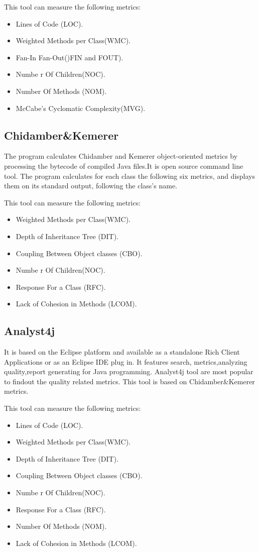 This tool can measure the following metrics:
\begin{itemize}
	\item Lines of Code (LOC). 
	\item Weighted Methods per Class(WMC).
	\item Fan-In Fan-Out()FIN and FOUT).
	\item Numbe r Of Children(NOC).
	\item Number Of Methods (NOM).
	\item McCabe's Cyclomatic Complexity(MVG).
\end{itemize}

\subsection{Chidamber\&Kemerer}

The program calculates Chidamber and Kemerer object-oriented metrics by processing the bytecode of compiled Java files.It is open source command line tool. The program calculates for each class the following six metrics, and displays them on its standard output, following the class's name.

This tool can measure the following metrics:

\begin{itemize}
	\item Weighted Methods per Class(WMC).
	\item Depth of Inheritance Tree (DIT).
	\item Coupling Between Object classes (CBO).
	\item Numbe r Of Children(NOC).
	\item Response For a Class (RFC).
	\item Lack of Cohesion in Methods (LCOM).
\end{itemize}

\subsection{Analyst4j}
It is based on the Eclipse platform and available as a standalone Rich Client Applications or as an Eclipse
IDE plug in. It features search, metrics,analyzing quality,report generating for Java programming.
Analyst4j tool are most popular to findout the quality related metrics. This tool is based on Chidamber\&Kemerer metrics.

This tool can measure the following metrics:
\begin{itemize}
	\item Lines of Code (LOC). 
	\item Weighted Methods per Class(WMC).
	\item Depth of Inheritance Tree (DIT).
	\item Coupling Between Object classes (CBO).
	\item Numbe r Of Children(NOC).
	\item Response For a Class (RFC).
	\item Number Of Methods (NOM).
	\item Lack of Cohesion in Methods (LCOM).
\end{itemize}

